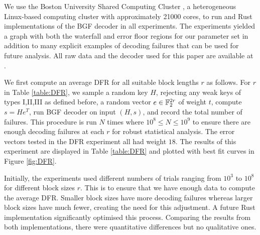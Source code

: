 
We use the Boston University Shared Computing Cluster \cite{SCC}, a heterogeneous Linux-based computing cluster with approximately 21000 cores, to run \SageMath{} and Rust implementations of the BGF decoder in all experiments. The experiments yielded a graph with both the waterfall and error floor regions for our parameter set in addition to many explicit examples of decoding failures that can be used for future analysis. All raw data and the decoder used for this paper are available at \cite{raw-data-decoder}.

We first compute an average DFR for all suitable block lengths $r$ as follows.  For $r$ in Table \ref{table:DFR}, we sample a random key $H$, rejecting any weak keys of types I,II,III as defined before, a random vector $e \in \mathbb{F}_2^{2r}$ of weight $t$, compute $s=He^T$, run BGF decoder on input $(H, s)$, and record the total number of failures.  This procedure is run $N$ times where $10^8 \le N \le 10^9$ to ensure there are enough decoding failures at each $r$ for robust statistical analysis.
The error vectors tested in the DFR experiment all had weight $18$. The results of this experiment are displayed in Table \ref{table:DFR} and plotted with best fit curves in Figure \ref{fig:DFR}.

\begin{remark}
Initially, the \SageMath{} experiments used different numbers of trials ranging from $10^3$ to $10^8$ for different block sizes $r$. This is to ensure that we have enough data to compute the average DFR. Smaller block sizes have more decoding failures whereas larger block sizes have much fewer, creating the need for this adjustment. A future Rust implementation significantly optimised this process. Comparing the results from both implementations, there were quantitative differences but no qualitative ones.
\end{remark}

